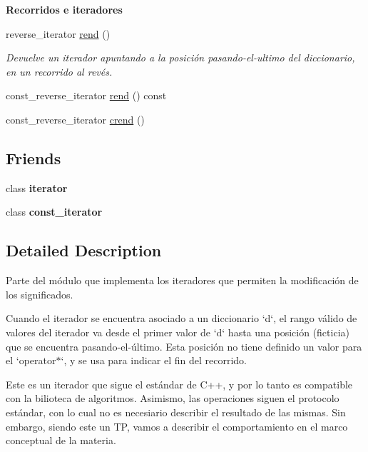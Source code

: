 \begin{Indent}{\bf \-Recorridos e iteradores}
\begin{DoxyCompactItemize}
\item 
reverse\-\_\-iterator \hyperlink{classaed2_1_1iterator_a0007a7962bc6aca8dca78c2a49bd581d}{rend} ()
\begin{DoxyCompactList}\small\item\em \-Devuelve un iterador apuntando a la posición pasando-\/el-\/ultimo del diccionario, en un recorrido al revés. \end{DoxyCompactList}\item 
const\-\_\-reverse\-\_\-iterator \hyperlink{classaed2_1_1iterator_a1230bf2063ce100c830129a24dea854d}{rend} () const 
\item 
const\-\_\-reverse\-\_\-iterator \hyperlink{classaed2_1_1iterator_a2e31ad7ded06c666c6c37c5d30bb41af}{crend} ()
\end{DoxyCompactItemize}
\end{Indent}
\subsection*{\-Friends}
\begin{DoxyCompactItemize}
\item 
\hypertarget{classaed2_1_1iterator_a67171474c4da6cc8efe0c7fafefd2b2d}{class {\bfseries iterator}}\label{classaed2_1_1iterator_a67171474c4da6cc8efe0c7fafefd2b2d}

\item 
\hypertarget{classaed2_1_1iterator_ac220ce1c155db1ac44146c12d178056f}{class {\bfseries const\-\_\-iterator}}\label{classaed2_1_1iterator_ac220ce1c155db1ac44146c12d178056f}

\end{DoxyCompactItemize}


\subsection{\-Detailed \-Description}
\-Parte del módulo que implementa los iteradores que permiten la modificación de los significados. 

\-Cuando el iterador se encuentra asociado a un diccionario `d`, el rango válido de valores del iterador va desde el primer valor de `d` hasta una posición (ficticia) que se encuentra pasando-\/el-\/último. \-Esta posición no tiene definido un valor para el `operator$\ast$`, y se usa para indicar el fin del recorrido.

\-Este es un iterador que sigue el estándar de \-C++, y por lo tanto es compatible con la bilioteca de algoritmos. \-Asimismo, las operaciones siguen el protocolo estándar, con lo cual no es necesiario describir el resultado de las mismas. \-Sin embargo, siendo este un \-T\-P, vamos a describir el comportamiento en el marco conceptual de la materia.

